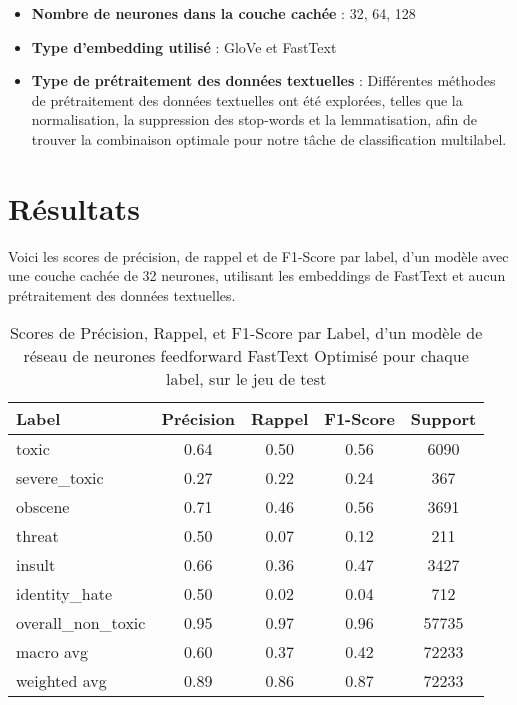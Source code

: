 \begin{itemize}
    \item \textbf{Nombre de neurones dans la couche cachée} : 32, 64, 128
    \item \textbf{Type d'embedding utilisé} : GloVe et FastText
    \item \textbf{Type de prétraitement des données textuelles} : Différentes méthodes de prétraitement des données textuelles ont été explorées, telles que la normalisation, la suppression des stop-words et la lemmatisation, afin de trouver la combinaison optimale pour notre tâche de classification multilabel.
\end{itemize}


\section{Résultats}

Voici les scores de précision, de rappel et de F1-Score par label, d'un modèle avec une couche cachée de 32 neurones, utilisant les embeddings de FastText et aucun prétraitement des données textuelles.

\begin{table}[ht]
    \centering
    \caption{Scores de Précision, Rappel, et F1-Score par Label, d'un modèle de réseau de neurones feedforward FastText Optimisé pour chaque label, sur le jeu de test}    \begin{tabular}{lcccc}
    \hline
    \textbf{Label} & \textbf{Précision} & \textbf{Rappel} & \textbf{F1-Score} & \textbf{Support} \\ \hline
    toxic          & 0.64               & 0.50            & 0.56              & 6090             \\
    severe\_toxic  & 0.27               & 0.22            & 0.24              & 367              \\
    obscene        & 0.71               & 0.46            & 0.56              & 3691             \\
    threat         & 0.50               & 0.07            & 0.12              & 211              \\
    insult         & 0.66               & 0.36            & 0.47              & 3427             \\
    identity\_hate & 0.50               & 0.02            & 0.04              & 712              \\
    overall\_non\_toxic & 0.95           & 0.97            & 0.96              & 57735            \\\hline
    macro avg      & 0.60              & 0.37            & 0.42              & 72233            \\
    weighted avg   & 0.89               & 0.86            & 0.87              & 72233            \\ \hline
    \end{tabular}
    \label{tab:scores}
\end{table}


